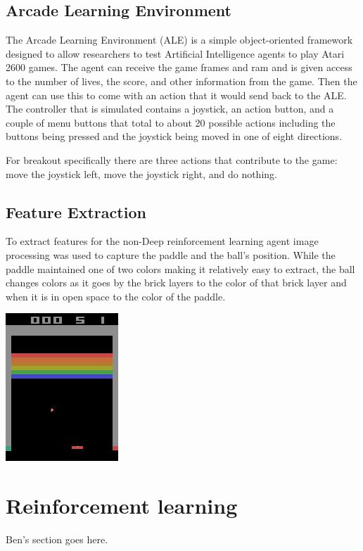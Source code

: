 \documentclass{article}
\begin{document}
\subsection{Arcade Learning Environment}
The Arcade Learning Environment (ALE) is a simple object-oriented framework designed to allow researchers to test Artificial Intelligence agents to play Atari 2600 games. The agent can receive the game frames and ram and is given access to the number of lives, the score, and other information from the game. Then the agent can use this to come with an action that it would send back to the ALE. The controller that is simulated contains a joystick, an action button, and a couple of menu buttons that total to about 20 possible actions including the buttons being pressed and the joystick being moved in one of eight directions.

For breakout specifically there are three actions that contribute to the game: move the joystick left, move the joystick right, and do nothing.

\subsection{Feature Extraction}
To extract features for the non-Deep reinforcement learning agent image processing was used to capture the paddle and the ball's position. While the paddle maintained one of two colors making it relatively easy to extract, the ball changes colors as it goes by the brick layers to the color of that brick layer and when it is in open space to the color of the paddle. 

  \begin{center}
  \includegraphics[scale=.75]{tmp2.jpg}
  \end{center}

\section{Reinforcement learning}
Ben's section goes here.
\end{document}
